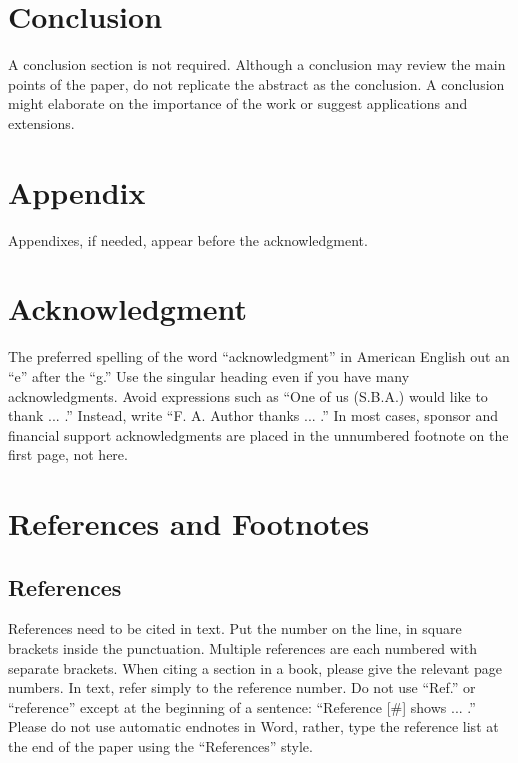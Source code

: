 \documentclass[journal]{IEEEtranTIE}
\begin{document}
\section{Conclusion}

A conclusion section is not required. Although a conclusion may review the main points of the paper, do not replicate the abstract as the conclusion. A conclusion might elaborate on the importance of the work or suggest applications and extensions.


\section*{Appendix}

Appendixes, if needed, appear before the acknowledgment.

{\color{red}
\section*{Acknowledgment}

The preferred spelling of the word ``acknowledgment'' in American English out an ``e'' after the ``g.'' Use the singular heading even if you have many acknowledgments. Avoid expressions such as ``One of us (S.B.A.) would like to thank ... .'' Instead, write ``F. A. Author thanks ... .'' In most cases, sponsor and financial support acknowledgments are placed in the unnumbered footnote on the first page, not here.
}

\section*{References and Footnotes}

\subsection{References}
References need to be cited in text. Put the number on the line, in square brackets inside the punctuation.  Multiple references are each numbered with separate brackets. When citing a section in a book, please give the relevant page numbers. In text, refer simply to the reference number. Do not use ``Ref.'' or ``reference'' except at the beginning of a sentence: ``Reference [\#] shows ... .'' Please do not use automatic endnotes in Word, rather, type the reference list at the end of the paper using the ``References'' style.
\end{document}
